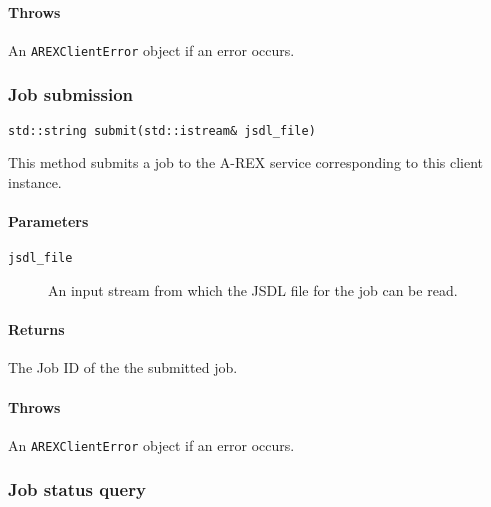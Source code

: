 \paragraph{Throws}

An \verb:AREXClientError: object if an error occurs.






\subsubsection{Job submission}

\begin{shaded}
\verb#std::string submit(std::istream& jsdl_file)#
\end{shaded}

This method submits a job to the A-REX service corresponding to this
client instance.

\paragraph{Parameters}
\begin{description}
\item[\texttt{jsdl\_file}] An input stream from which the JSDL file for
the job can be read.
\end{description}

\paragraph{Returns}
The Job ID of the the submitted job.

\paragraph{Throws}
An \verb:AREXClientError: object if an error occurs.      


\subsubsection{Job status query}

